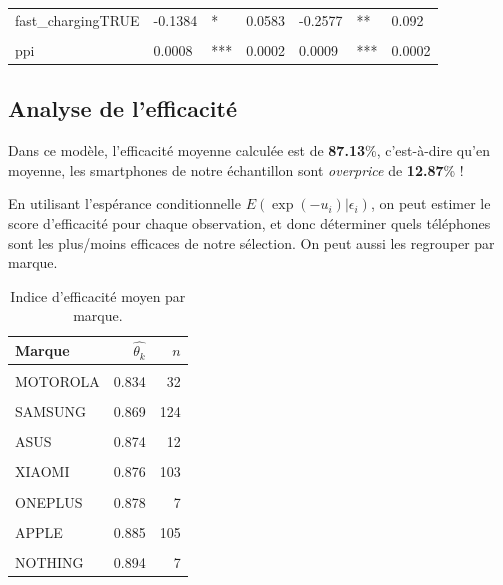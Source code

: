 \documentclass[
  12pt,
]{report}
\begin{document}
\begin{table}[!h]
\begin{tabular}[t]{lllllll}
fast\_chargingTRUE & -0.1384 & * & 0.0583 & -0.2577 & ** & 0.092\\
\cellcolor{gray!6}{network5G} & \cellcolor{gray!6}{0.3058} & \cellcolor{gray!6}{***} & \cellcolor{gray!6}{0.0365} & \cellcolor{gray!6}{0.3049} & \cellcolor{gray!6}{***} & \cellcolor{gray!6}{0.0357}\\
ppi & 0.0008 & *** & 0.0002 & 0.0009 & *** & 0.0002\\
\bottomrule
\end{tabular}
\end{table}

\newpage

\subsection{Analyse de l'efficacité}\label{analyse-de-lefficacituxe9}

Dans ce modèle, l'efficacité moyenne calculée est de \textbf{87.13}\%,
c'est-à-dire qu'en moyenne, les smartphones de notre échantillon sont
\emph{overprice} de \textbf{12.87}\% !

En utilisant l'espérance conditionnelle \(E(\exp(-u_i) | \epsilon_i)\),
on peut estimer le score d'efficacité pour chaque observation, et donc
déterminer quels téléphones sont les plus/moins efficaces de notre
sélection. On peut aussi les regrouper par marque.

\begin{table}[!h]

\caption{\label{tab:eff_brands}Indice d'efficacité moyen par marque.}
\centering
\begin{tabular}[t]{lrr}
\toprule
\textbf{Marque} & \textbf{$\hat{\theta_k}$} & \textbf{$n$}\\
\midrule
\cellcolor{gray!6}{OPPO} & \cellcolor{gray!6}{0.824} & \cellcolor{gray!6}{17}\\
MOTOROLA & 0.834 & 32\\
\cellcolor{gray!6}{HONOR} & \cellcolor{gray!6}{0.865} & \cellcolor{gray!6}{14}\\
SAMSUNG & 0.869 & 124\\
\cellcolor{gray!6}{GOOGLE} & \cellcolor{gray!6}{0.870} & \cellcolor{gray!6}{25}\\
\addlinespace
ASUS & 0.874 & 12\\
\cellcolor{gray!6}{VIVO} & \cellcolor{gray!6}{0.875} & \cellcolor{gray!6}{9}\\
XIAOMI & 0.876 & 103\\
\cellcolor{gray!6}{REALME} & \cellcolor{gray!6}{0.877} & \cellcolor{gray!6}{14}\\
ONEPLUS & 0.878 & 7\\
\addlinespace
\cellcolor{gray!6}{SONY} & \cellcolor{gray!6}{0.881} & \cellcolor{gray!6}{15}\\
APPLE & 0.885 & 105\\
\cellcolor{gray!6}{FAIRPHONE} & \cellcolor{gray!6}{0.892} & \cellcolor{gray!6}{3}\\
NOTHING & 0.894 & 7\\
\bottomrule
\end{tabular}
\end{table}
\end{document}
